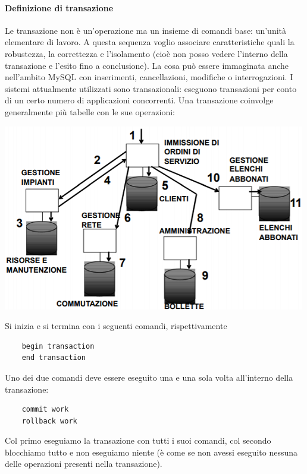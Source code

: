 \paragraph{Definizione di transazione} Le transazione non è un'operazione ma un insieme di comandi base: un'unità elementare di lavoro. A questa sequenza voglio associare caratteristiche quali la robustezza, la correttezza e l'isolamento (cioè non posso vedere l'interno della transazione e l'esito fino a conclusione). La cosa può essere immaginata anche nell'ambito MySQL con inserimenti, cancellazioni, modifiche o interrogazioni. I sistemi attualmente utilizzati sono transazionali: eseguono transazioni per conto di un certo numero di applicazioni concorrenti.
\pagebreak
Una transazione coinvolge generalmente più tabelle con le sue operazioni:
\begin{center}
	\includegraphics{images/132.PNG}
\end{center}
Si inizia e si termina con i seguenti comandi, rispettivamente
\begin{verbatim}
	begin transaction
	end transaction
\end{verbatim}
Uno dei due comandi deve essere eseguito una e una sola volta all'interno della transazione:
\begin{verbatim}
	commit work
	rollback work
\end{verbatim}
Col primo eseguiamo la transazione con tutti i suoi comandi, col secondo blocchiamo tutto e non eseguiamo niente (è come se non avessi eseguito nessuna delle operazioni presenti nella transazione).

